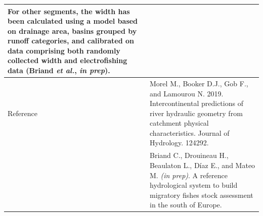 \documentclass[pdftex,12pt,a4paper,svgnames]{report}\usepackage[]{graphicx}\usepackage[]{color}
\begin{document}
\begin{minipage}[c]{\textwidth}
\begin{minipage}[c]{\textwidth}
\begin{tabular}{p{3cm}p{12cm}}
For other segments, the width has been calculated using a model based on drainage area, basins grouped by runoff categories, and calibrated on data comprising both randomly collected width and electrofishing data (Briand \textit{et al.}, \textit{in prep}).\\
\midrule  
Reference & Morel M., Booker D.J., Gob F., and Lamourou N. 2019. Intercontinental predictions of river hydraulic geometry from catchment physical characteristics. Journal of Hydrology. 124292.\\
 & Briand C., Drouineau H., Beaulaton L., Díaz E., and Mateo M. \textit{(in prep)}. A reference hydrological system to build migratory fishes stock assessment in the south of Europe.\\
\bottomrule 
\end{tabular} 
\end{minipage} 
\end{minipage}
\clearpage
{}
{}
\end{document}
